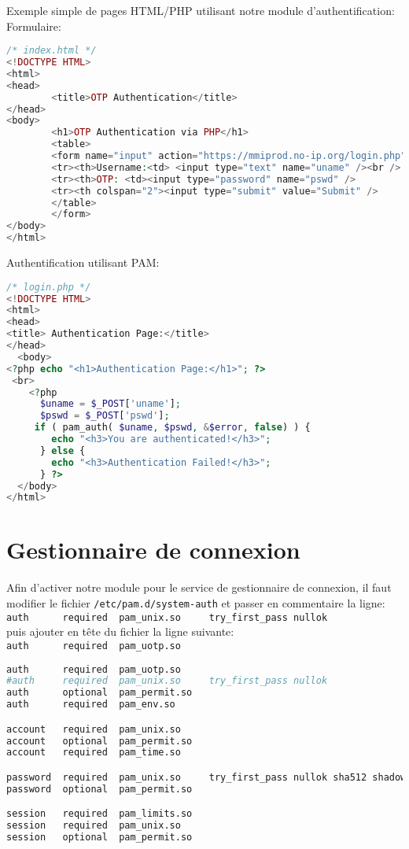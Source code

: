 \documentclass{"../../../res/univ-projet"}
\begin{document}
\newpage

Exemple simple de pages HTML/PHP utilisant notre module d'authentification:
Formulaire:
\begin{lstlisting}[language=php]
/* index.html */
<!DOCTYPE HTML>
<html>
<head>
        <title>OTP Authentication</title>
</head>
<body>
        <h1>OTP Authentication via PHP</h1>
        <table>
        <form name="input" action="https://mmiprod.no-ip.org/login.php" method="post">
        <tr><th>Username:<td> <input type="text" name="uname" /><br />
        <tr><th>OTP: <td><input type="password" name="pswd" />
        <tr><th colspan="2"><input type="submit" value="Submit" />
        </table>
        </form>
</body>
</html> 
\end{lstlisting}

Authentification utilisant PAM:
\begin{lstlisting}[language=php]
/* login.php */
<!DOCTYPE HTML>
<html>
<head>
<title> Authentication Page:</title>
</head>
  <body>
<?php echo "<h1>Authentication Page:</h1>"; ?>
 <br>
    <?php
      $uname = $_POST['uname'];
      $pswd = $_POST['pswd'];
     if ( pam_auth( $uname, $pswd, &$error, false) ) {
        echo "<h3>You are authenticated!</h3>";
      } else {
        echo "<h3>Authentication Failed!</h3>";
      } ?>
  </body>
</html> 
\end{lstlisting}

\newpage

\section{Gestionnaire de connexion}
Afin d'activer notre module pour le service de gestionnaire de connexion, il faut modifier le fichier \verb?/etc/pam.d/system-auth?
et passer en commentaire la ligne:\\
\verb?auth      required  pam_unix.so     try_first_pass nullok?\\
puis ajouter en tête du fichier la ligne suivante:\\
\verb?auth      required  pam_uotp.so?
\begin{lstlisting}[language=bash, backgroundcolor=\color{black}, basicstyle=\color{white}]
auth      required  pam_uotp.so
#auth     required  pam_unix.so     try_first_pass nullok
auth      optional  pam_permit.so
auth      required  pam_env.so

account   required  pam_unix.so
account   optional  pam_permit.so
account   required  pam_time.so

password  required  pam_unix.so     try_first_pass nullok sha512 shadow
password  optional  pam_permit.so

session   required  pam_limits.so
session   required  pam_unix.so
session   optional  pam_permit.so
\end{lstlisting}
\end{document}

